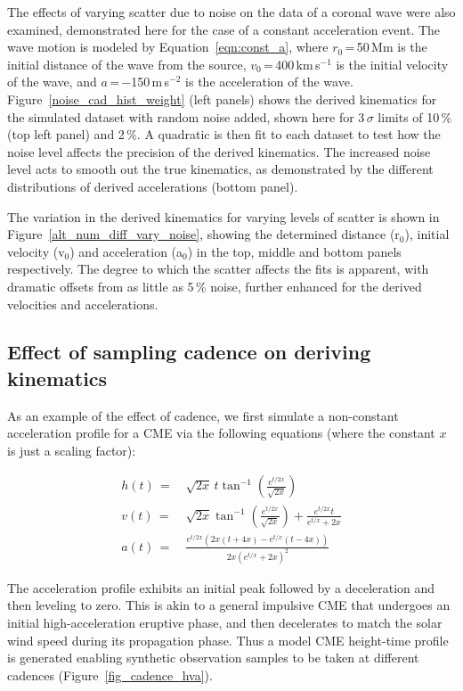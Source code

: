 \documentclass[structabstract]{aa}
\begin{document}
The effects of varying scatter due to noise on the data of a coronal wave were also examined, demonstrated here for the case of a constant acceleration event. The wave motion is modeled by Equation~\ref{eqn:const_a}, where $r_0$\,=\,50\,Mm is the initial distance of the wave from the source, $v_0$\,=\,400\,km\,s$^{-1}$ is the initial velocity of the wave, and $a$\,=\,$-$150\,m\,s$^{-2}$ is the acceleration of the wave. Figure~\ref{noise_cad_hist_weight} (left panels) shows the derived kinematics for the simulated dataset with random noise added, shown here for 3\,$\sigma$ limits of 10\,\% (top left panel) and 2\,\%. A quadratic is then fit to each dataset to test how the noise level affects the precision of the derived kinematics. The increased noise level acts to smooth out the true kinematics, as demonstrated by the different distributions of derived accelerations (bottom panel).

The variation in the derived kinematics for varying levels of scatter is shown in Figure~\ref{alt_num_diff_vary_noise}, showing the determined distance (r$_{0}$), initial velocity (v$_{0}$) and acceleration (a$_{0}$) in the top, middle and bottom panels respectively. The degree to which the scatter affects the fits is apparent, with dramatic offsets from as little as 5\,\% noise, further enhanced for the derived velocities and accelerations. 


\subsection{Effect of sampling cadence on deriving kinematics}
\label{subsect:test_lagrange_nonconst}


As an example of the effect of cadence, we first simulate a non-constant acceleration profile for a CME via the following equations (where the constant $x$ is just a scaling factor):

\begin{eqnarray}
h(t)\,=&\,\sqrt{2x}\,t\tan^{-1}\left(\frac{e^{t/2x}}{\sqrt{2x}}\right) \\
v(t)\,=&\,\sqrt{2x}\tan^{-1}\left(\frac{e^{t/2x}}{\sqrt{2x}}\right)+\frac{e^{t/2x}t}{e^{t/x}+2x} \\
a(t)\,=&\,\frac{e^{t/2x}\left(2x\left(t+4x\right)-e^{t/x}\left(t-4x\right)\right)}{2x\left(e^{t/x}+2x\right)^2}
\end{eqnarray}

The acceleration profile exhibits an initial peak followed by a deceleration and then leveling to zero. This is akin to a general impulsive CME that undergoes an initial high-acceleration eruptive phase, and then decelerates to match the solar wind speed during its propagation phase. Thus a model CME height-time profile is generated enabling synthetic observation samples to be taken at different cadences (Figure~\ref{fig_cadence_hva}). 
\end{document}
